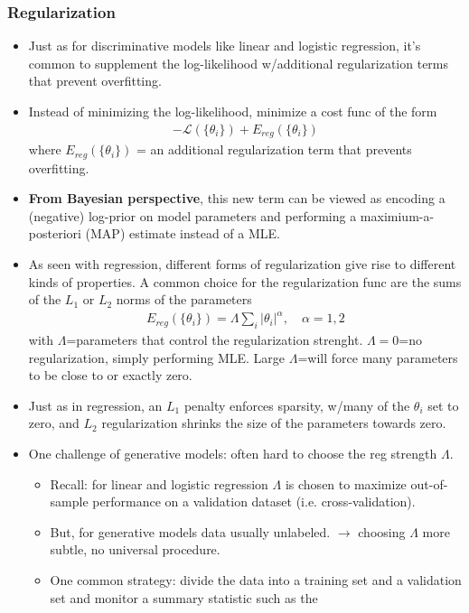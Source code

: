 \documentclass[norsk,a4paper,11pt]{article}
\begin{document}
\subsubsection{Regularization}
\begin{itemize}
	\item Just as for discriminative models like linear and logistic regression, it's common to supplement the log-likelihood w/additional regularization terms that prevent overfitting. 
	\item Instead of minimizing the log-likelihood, minimize a cost func of the form
	\begin{align}
		- \mathcal{L}(\{ \theta_i \}) + E_{reg} (\{ \theta_i \})
	\end{align}
	where $E_{reg} (\{ \theta_i \})$ = an additional regularization term that prevents overfitting.
	\item \textbf{From Bayesian perspective}, this new term can be viewed as encoding a (negative) log-prior on model parameters and performing a maximium-a-posteriori (MAP) estimate instead of a MLE.
	\item As seen with regression, different forms of regularization give rise to different kinds of properties. A common choice for the regularization func are the sums of the $L_1$ or $L_2$ norms of the parameters
	\begin{align}
		E_{reg} (\{ \theta_i \}) = \Lambda \sum_i | \theta_i |^\alpha , \quad \alpha = 1,2 
	\end{align}
	with $\Lambda$=parameters that control the regularization strenght. $\Lambda=0$=no regularization, simply performing MLE. Large $\Lambda$=will force many parameters to be close to or exactly zero.
	\item Just as in regression, an $L_1$ penalty enforces sparsity, w/many of the $\theta_i$ set to zero, and $L_2$ regularization shrinks the size of the parameters towards zero.
	\item One challenge of generative models: often hard to choose the reg strength $\Lambda$.
	\begin{itemize}
		\item Recall: for linear and logistic regression $\Lambda$ is chosen to maximize out-of-sample performance on a validation dataset (i.e. cross-validation).
		\item But, for generative models data usually unlabeled. $\rightarrow$ choosing $\Lambda$ more subtle, no universal procedure.
		\item One common strategy: divide the data into a training set and a validation set and monitor a summary statistic such as the

\end{itemize}
\end{itemize}
\end{document}
